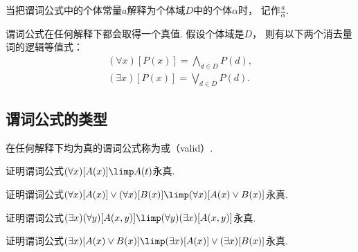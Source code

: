 当把谓词公式中的个体常量\(a\)解释为个体域\(D\)中的个体\(\alpha\)时，
记作\(\frac{a}{\alpha}\).

谓词公式在任何解释下都会取得一个真值.
假设个体域是\(D\)，
则有以下两个消去量词的逻辑等值式：\begin{gather}
	(\forall x)[P(x)]
	= \bigwedge_{d \in D} P(d), \\
	(\exists x)[P(x)]
	= \bigvee_{d \in D} P(d).
\end{gather}

\subsection{谓词公式的类型}
在任何解释下均为真的谓词公式称为或（valid）.

\begin{example}
证明谓词公式\((\forall x)[A(x)] \limp A(t)\)永真.
\end{example}

\begin{example}
证明谓词公式\(
	(\forall x)[A(x)]
	\lor
	(\forall x)[B(x)]
	\limp
	(\forall x)
	[
		A(x) \lor B(x)
	]
\)永真.
\end{example}

\begin{example}
证明谓词公式\(
	(\exists x)
	(\forall y)
	[A(x,y)]
	\limp
	(\forall y)
	(\exists x)
	[A(x,y)]
\)永真.
\end{example}

\begin{example}
证明谓词公式\(
	(\exists x)
	[
		A(x) \lor B(x)
	]
	\limp
	(\exists x)
	[A(x)]
	\lor
	(\exists x)
	[B(x)]
\)永真.
\end{example}

